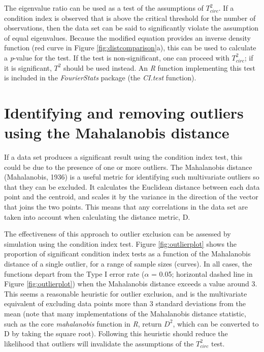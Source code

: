 \documentclass[]{article}
\begin{document}
The eigenvalue ratio can be used as a test of the assumptions of \(T^2_{circ}\). If a condition index is observed that is above the critical threshold for the number of observations, then the data set can be said to significantly violate the assumption of equal eigenvalues. Because the modified equation provides an inverse density function (red curve in Figure \ref{fig:distcomparison}a), this can be used to calculate a \emph{p}-value for the test. If the test is non-significant, one can proceed with \(T^2_{circ}\); if it is significant, \(T^2\) should be used instead. An \emph{R} function implementing this test is included in the \emph{FourierStats} package (the \emph{CI.test} function).

\hypertarget{identifying-and-removing-outliers-using-the-mahalanobis-distance}{%
\section{Identifying and removing outliers using the Mahalanobis distance}\label{identifying-and-removing-outliers-using-the-mahalanobis-distance}}

If a data set produces a significant result using the condition index test, this could be due to the presence of one or more outliers. The Mahalanobis distance (Mahalanobis, 1936) is a useful metric for identifying such multivariate outliers so that they can be excluded. It calculates the Euclidean distance between each data point and the centroid, and scales it by the variance in the direction of the vector that joins the two points. This means that any correlations in the data set are taken into account when calculating the distance metric, D.

The effectiveness of this approach to outlier exclusion can be assessed by simulation using the condition index test. Figure \ref{fig:outlierplot} shows the proportion of significant condition index tests as a function of the Mahalanobis distance of a single outlier, for a range of sample sizes (curves). In all cases, the functions depart from the Type I error rate (\(\alpha\) = 0.05; horizontal dashed line in Figure \ref{fig:outlierplot}) when the Mahalanobis distance exceeds a value around 3. This seems a reasonable heuristic for outlier exclusion, and is the multivariate equivalent of excluding data points more than 3 standard deviations from the mean (note that many implementations of the Mahalanobis distance statistic, such as the core \emph{mahalanobis} function in \emph{R}, return \(D^2\), which can be converted to D by taking the square root). Following this heuristic should reduce the likelihood that outliers will invalidate the assumptions of the \(T^2_{circ}\) test.
\end{document}
